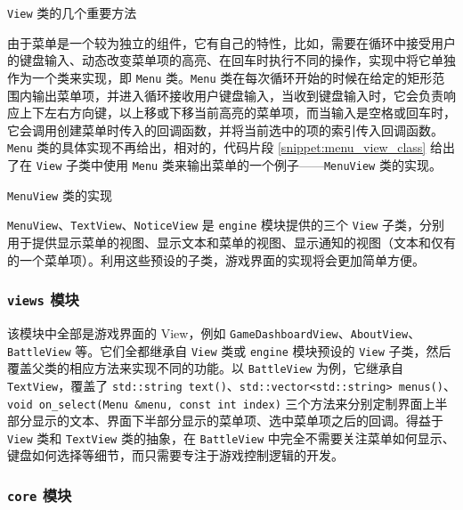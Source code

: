 \documentclass[a4paper, 11pt]{article}
\newcommand{\codeinline}{\texttt}
\begin{document}
\begin{snippet}
	\caption{\codeinline{View} 类的几个重要方法}
	\label{snippet:view_class}
\end{snippet}

由于菜单是一个较为独立的组件，它有自己的特性，比如，需要在循环中接受用户的键盘输入、动态改变菜单项的高亮、在回车时执行不同的操作，实现中将它单独作为一个类来实现，即 \codeinline{Menu} 类。\codeinline{Menu} 类在每次循环开始的时候在给定的矩形范围内输出菜单项，并进入循环接收用户键盘输入，当收到键盘输入时，它会负责响应上下左右方向键，以上移或下移当前高亮的菜单项，而当输入是空格或回车时，它会调用创建菜单时传入的回调函数，并将当前选中的项的索引传入回调函数。\codeinline{Menu} 类的具体实现不再给出，相对的，代码片段 \ref{snippet:menu_view_class} 给出了在 \codeinline{View} 子类中使用 \codeinline{Menu} 类来输出菜单的一个例子——\codeinline{MenuView} 类的实现。

\begin{snippet}
	\caption{\codeinline{MenuView} 类的实现}
	\label{snippet:menu_view_class}
\end{snippet}

\codeinline{MenuView}、\codeinline{TextView}、\codeinline{NoticeView} 是 \codeinline{engine} 模块提供的三个 \codeinline{View} 子类，分别用于提供显示菜单的视图、显示文本和菜单的视图、显示通知的视图（文本和仅有的一个菜单项）。利用这些预设的子类，游戏界面的实现将会更加简单方便。

\subsubsection{\codeinline{views} 模块}

该模块中全部是游戏界面的 View，例如 \codeinline{GameDashboardView}、\codeinline{AboutView}、\codeinline{BattleView} 等。它们全都继承自 \codeinline{View} 类或 \codeinline{engine} 模块预设的 \codeinline{View} 子类，然后覆盖父类的相应方法来实现不同的功能。以 \codeinline{BattleView} 为例，它继承自 \codeinline{TextView}，覆盖了 \codeinline{std::string text()}、\codeinline{std::vector<std::string> menus()}、\codeinline{void on_select(Menu &menu, const int index)} 三个方法来分别定制界面上半部分显示的文本、界面下半部分显示的菜单项、选中菜单项之后的回调。得益于 \codeinline{View} 类和 \codeinline{TextView} 类的抽象，在 \codeinline{BattleView} 中完全不需要关注菜单如何显示、键盘如何选择等细节，而只需要专注于游戏控制逻辑的开发。

\subsubsection{\codeinline{core} 模块}
\end{document}
